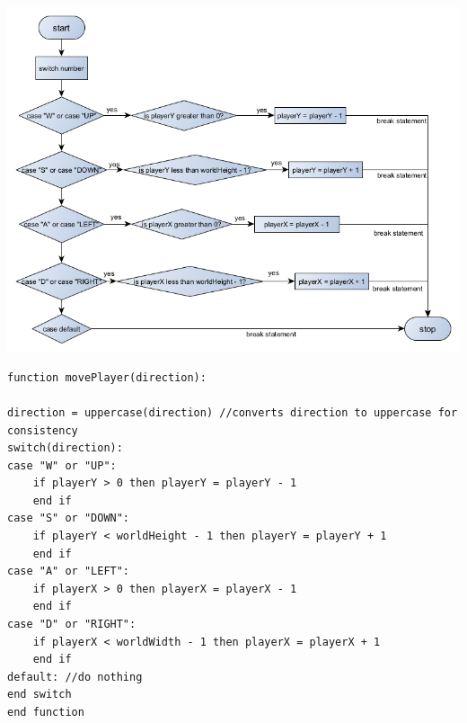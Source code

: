 {\includegraphics[width=\textwidth]{../flowchart/movePlayer.png}}
\begin{lstlisting}
function movePlayer(direction):

direction = uppercase(direction) //converts direction to uppercase for consistency
switch(direction):
case "W" or "UP":
	if playerY > 0 then playerY = playerY - 1
	end if
case "S" or "DOWN":
	if playerY < worldHeight - 1 then playerY = playerY + 1
	end if
case "A" or "LEFT":
	if playerX > 0 then playerX = playerX - 1
	end if
case "D" or "RIGHT":
	if playerX < worldWidth - 1 then playerX = playerX + 1
	end if
default: //do nothing
end switch
end function
\end{lstlisting}
\newpage

